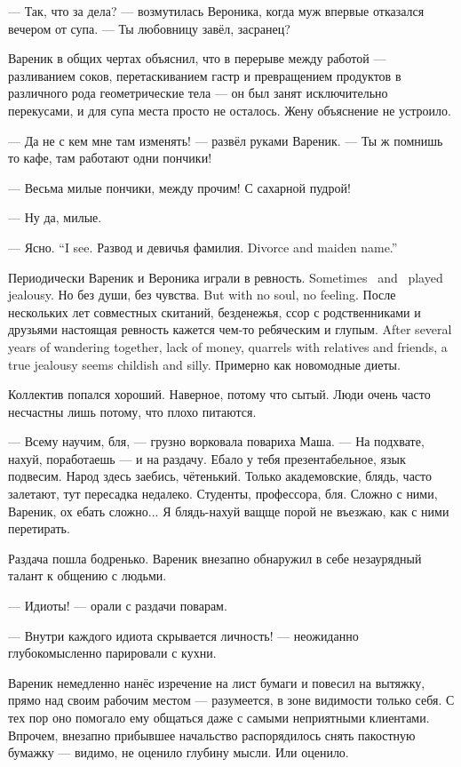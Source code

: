 --- Так, что за дела? --- возмутилась Вероника, когда муж впервые отказался вечером от супа.
--- Ты любовницу завёл, засранец?

Вареник в общих чертах объяснил, что в перерыве между работой --- разливанием соков, перетаскиванием гастр и превращением продуктов в различного рода геометрические тела --- он был занят исключительно перекусами, и для супа места просто не осталось.
Жену объяснение не устроило.

--- Да не с кем мне там изменять! --- развёл руками Вареник.
--- Ты ж помнишь то кафе, там работают одни пончики!

--- Весьма милые пончики, между прочим!
С сахарной пудрой!

--- Ну да, милые.

{--- Ясно.}
{``I see.}
{Развод и девичья фамилия.}
{Divorce and maiden name.''}

{Периодически Вареник и Вероника играли в ревность.}
{Sometimes \Varenik\ and \Veronika\ played jealousy.}
{Но без души, без чувства.}
{But with no soul, no feeling.}
{После нескольких лет совместных скитаний, безденежья, ссор с родственниками и друзьями настоящая ревность кажется чем-то ребяческим и глупым.}
{After several years of wandering together, lack of money, quarrels with relatives and friends, a true jealousy seems childish and silly.}
Примерно как новомодные диеты.

\asterism

Коллектив попался хороший.
Наверное, потому что сытый.
Люди очень часто несчастны лишь потому, что плохо питаются.

--- Всему научим, бля, --- грузно ворковала повариха Маша.
--- На подхвате, нахуй, поработаешь --- и на раздачу.
Ебало у тебя презентабельное, язык подвесим.
Народ здесь заебись, чётенький.
Только академовские, блядь, часто залетают, тут пересадка недалеко.
Студенты, профессора, бля.
Сложно с ними, Вареник, ох ебать сложно...
Я блядь-нахуй ващще порой не въезжаю, как с ними перетирать.

Раздача пошла бодренько.
Вареник внезапно обнаружил в себе незаурядный талант к общению с людьми.

--- Идиоты! --- орали с раздачи поварам.

--- Внутри каждого идиота скрывается личность! --- неожиданно глубокомысленно парировали с кухни.

Вареник немедленно нанёс изречение на лист бумаги и повесил на вытяжку, прямо над своим рабочим местом --- разумеется, в зоне видимости только себя.
С тех пор оно помогало ему общаться даже с самыми неприятными клиентами.
Впрочем, внезапно прибывшее начальство распорядилось снять пакостную бумажку --- видимо, не оценило глубину мысли.
Или оценило.

